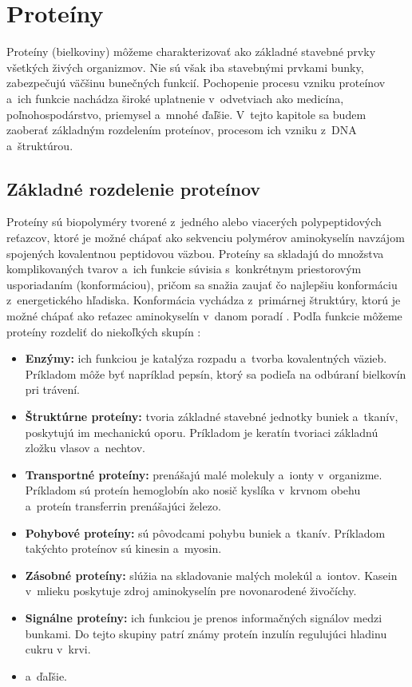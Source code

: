 \chapter{Proteíny}

Proteíny (bielkoviny) môžeme charakterizovať ako základné stavebné prvky všetkých živých organizmov. Nie sú však iba stavebnými prvkami bunky, zabezpečujú väčšinu bunečných funkcií. Pochopenie procesu vzniku proteínov a~ich funkcie nachádza široké uplatnenie v~odvetviach ako medicína, poľnohospodárstvo, priemysel a~mnohé ďaľšie. 
V~tejto kapitole sa budem zaoberať základným rozdelením proteínov, procesom ich vzniku z~DNA a~štruktúrou.

\section{Základné rozdelenie proteínov}

Proteíny sú biopolyméry tvorené z~jedného alebo viacerých polypeptidových reťazcov, ktoré je možné chápať ako sekvenciu polymérov aminokyselín navzájom spojených kovalentnou peptidovou väzbou. Proteíny sa skladajú do množstva komplikovaných tvarov a~ich funkcie súvisia s~konkrétnym priestorovým usporiadaním (konformáciou), pričom sa snažia zaujať čo najlepšiu konformáciu z~energetického hľadiska. Konformácia vychádza z~primárnej štruktúry, ktorú je možné chápať ako reťazec aminokyselín v~danom poradí \cite{proteiny}. Podľa funkcie môžeme proteíny rozdeliť do niekoľkých skupín \cite{proteiny}:  
\begin{itemize}
	\item \textbf{Enzýmy:} ich funkciou je katalýza rozpadu a~tvorba kovalentných väzieb. Príkladom môže byť napríklad pepsín, ktorý sa podieľa na odbúraní bielkovín pri trávení.
	\item \textbf{Štruktúrne proteíny:} tvoria základné stavebné jednotky buniek a~tkanív, poskytujú im mechanickú oporu. Príkladom je keratín tvoriaci základnú zložku vlasov a~nechtov.
	\item \textbf{Transportné proteíny:} prenášajú malé molekuly a~ionty v~organizme. Príkladom sú proteín hemoglobín ako nosič kyslíka v~krvnom obehu a~proteín transferrin prenášajúci železo.
	\item \textbf{Pohybové proteíny:} sú pôvodcami pohybu buniek a~tkanív. Príkladom takýchto proteínov sú kinesin a~myosin.
	\item \textbf{Zásobné proteíny:} slúžia na skladovanie malých molekúl a~iontov. Kasein v~mlieku poskytuje zdroj aminokyselín pre novonarodené živočíchy. 
	\item \textbf{Signálne proteíny:} ich funkciou je prenos informačných signálov medzi bunkami. Do tejto skupiny patrí známy proteín inzulín regulujúci hladinu cukru v~krvi.
	\item a~ďaľšie.
\end{itemize}

